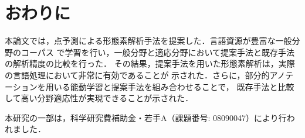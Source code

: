 \documentclass[japanese]{jnlp_1.4}
\begin{document}
\section{おわりに}
\label{section:おわりに}

本論文では，点予測による形態素解析手法を提案した．言語資源が豊富な一般分野のコーパス
で学習を行い，一般分野と適応分野において提案手法と既存手法の解析精度の比較を行った．
その結果，提案手法を用いた形態素解析は，実際の言語処理において非常に有効であることが
示された．さらに，部分的アノテーションを用いる能動学習と提案手法を組み合わせることで，
既存手法と比較して高い分野適応性が実現できることが示された．




\acknowledgment

本研究の一部は，科学研究費補助金・若手A（課題番号: 08090047）により行われました．
\end{document}
